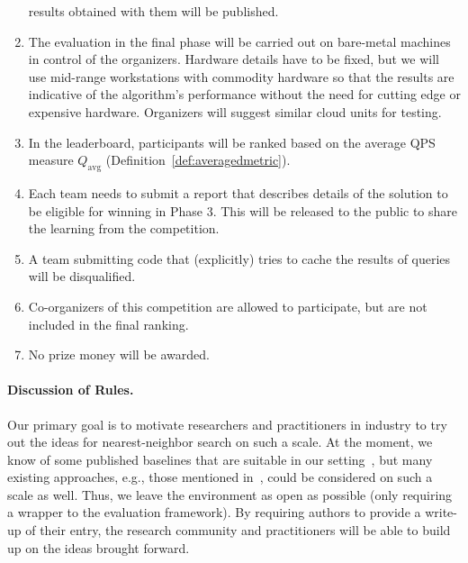 \begin{enumerate}
  results obtained with them will be published.
  \item The evaluation in the final phase will be carried out on
    bare-metal machines in control of the organizers. Hardware details
    have to be fixed, but we will use mid-range workstations with
    commodity hardware so that the results are indicative of the
    algorithm's performance without the need for cutting edge or
    expensive hardware.  Organizers will suggest similar cloud units
    for testing.
  \item 
    In the leaderboard, participants will be ranked based on the average QPS measure $Q_\mathrm{avg}$ (Definition~\ref{def:averagedmetric}).
      \item Each team needs to submit a report that describes details of
    the solution to be eligible for winning in Phase 3. This will be
    released to the public to share the learning from the competition.

  \item A team submitting code that (explicitly) tries to cache the results of queries will be disqualified.
  \item Co-organizers of this competition are allowed to participate, but are not included in the final ranking.
  \item No prize money will be awarded. 
\end{enumerate}



\paragraph{Discussion of Rules.}  
Our primary goal is to motivate researchers and practitioners in
industry to try out the ideas for nearest-neighbor search on such a
scale. At the moment, we know of some published baselines that are
suitable in our
setting~\cite{deep1b-link,babenko2014inverted,groh2019ggnn}, but many
existing approaches, e.g., those mentioned in~\cite{Benchmark}, could
be considered on such a scale as well. Thus, we leave the environment
as open as possible (only requiring a wrapper to the evaluation
framework).  By requiring authors to provide a write-up of their
entry, the research community and practitioners will be able to build
up on the ideas brought forward.

